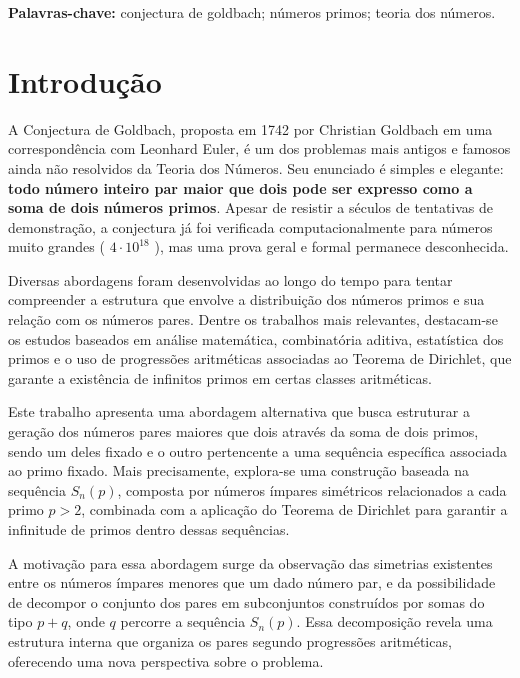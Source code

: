 \documentclass[a4paper,11pt]{article}
\theoremstyle{definition}
\theoremstyle{remark}
\begin{document}
	\textbf{Palavras-chave:} conjectura de goldbach; números primos; teoria dos números.
	
	
	\begin{otherlanguage}{brazil}
	\section{Introdução}

	A Conjectura de Goldbach, proposta em 1742 por Christian Goldbach em uma correspondência com Leonhard Euler, é um dos problemas mais antigos e famosos ainda não resolvidos da Teoria dos Números. Seu enunciado é simples e elegante: \textbf{todo número inteiro par maior que dois pode ser expresso como a soma de dois números primos}. Apesar de resistir a séculos de tentativas de demonstração, a conjectura já foi verificada computacionalmente para números muito grandes ( \(4 \cdot 10^{18} \) )\cite{oliveira}, mas uma prova geral e formal permanece desconhecida.
	
	Diversas abordagens foram desenvolvidas ao longo do tempo para tentar compreender a estrutura que envolve a distribuição dos números primos e sua relação com os números pares. Dentre os trabalhos mais relevantes, destacam-se os estudos baseados em análise matemática, combinatória aditiva, estatística dos primos e o uso de progressões aritméticas associadas ao Teorema de Dirichlet, que garante a existência de infinitos primos em certas classes aritméticas.
	
	Este trabalho apresenta uma abordagem alternativa que busca estruturar a geração dos números pares maiores que dois através da soma de dois primos, sendo um deles fixado e o outro pertencente a uma sequência específica associada ao primo fixado. Mais precisamente, explora-se uma construção baseada na sequência \(S_n(p)\), composta por números ímpares simétricos relacionados a cada primo \(p > 2\), combinada com a aplicação do Teorema de Dirichlet para garantir a infinitude de primos dentro dessas sequências.
	
	A motivação para essa abordagem surge da observação das simetrias existentes entre os números ímpares menores que um dado número par, e da possibilidade de decompor o conjunto dos pares em subconjuntos construídos por somas do tipo \(p + q\), onde \(q\) percorre a sequência \(S_n(p)\). Essa decomposição revela uma estrutura interna que organiza os pares segundo progressões aritméticas, oferecendo uma nova perspectiva sobre o problema.
	

\end{otherlanguage}
\end{document}
